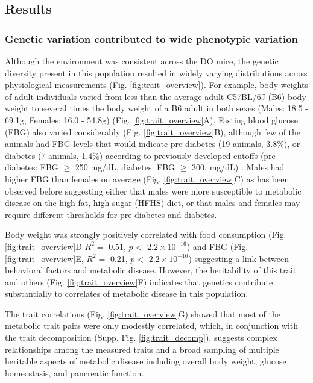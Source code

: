 \documentclass[
]{article}
\begin{document}
\subsection{Results}\label{results}

\subsubsection{Genetic variation contributed to wide phenotypic
variation}\label{genetic-variation-contributed-to-wide-phenotypic-variation}

Although the environment was consistent across the DO mice, the genetic
diversity present in this population resulted in widely varying
distributions across physiological measurements (Fig.
\ref{fig:trait_overview}). For example, body weights of adult
individuals varied from less than the average adult C57BL/6J (B6) body
weight to several times the body weight of a B6 adult in both sexes
(Males: 18.5 - 69.1g, Females: 16.0 - 54.8g) (Fig.
\ref{fig:trait_overview}A). Fasting blood glucose (FBG) also varied
considerably (Fig. \ref{fig:trait_overview}B), although few of the
animals had FBG levels that would indicate pre-diabetes (19 animals,
3.8\%), or diabetes (7 animals, 1.4\%) according to previously developed
cutoffs (pre-diabetes: FBG \(\geq\) 250 mg/dL, diabetes: FBG \(\geq\)
300, mg/dL) \cite{pmid17018838}. Males had higher FBG than females on
average (Fig. \ref{fig:trait_overview}C) as has been observed before
suggesting either that males were more susceptible to metabolic disease
on the high-fat, high-sugar (HFHS) diet, or that males and females may
require different thresholds for pre-diabetes and diabetes.

Body weight was strongly positively correlated with food consumption
(Fig. \ref{fig:trait_overview}D \(R^2 =\) 0.51, \(p<\)
\ensuremath{2.2\times 10^{-16}}) and FBG (Fig.
\ref{fig:trait_overview}E, \(R^2=\) 0.21, \(p <\)
\ensuremath{2.2\times 10^{-16}}) suggesting a link between behavioral
factors and metabolic disease. However, the heritability of this trait
and others (Fig. \ref{fig:trait_overview}F) indicates that genetics
contribute substantially to correlates of metabolic disease in this
population.

The trait correlations (Fig. \ref{fig:trait_overview}G) showed that most
of the metabolic trait pairs were only modestly correlated, which, in
conjunction with the trait decomposition (Supp. Fig.
\ref{fig:trait_decomp}), suggests complex relationships among the
measured traits and a broad sampling of multiple heritable aspects of
metabolic disease including overall body weight, glucose homeostasis,
and pancreatic function.
\end{document}
